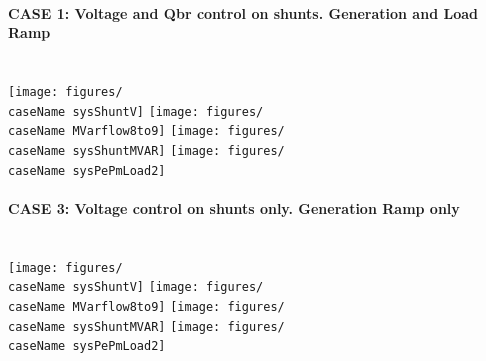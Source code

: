 \documentclass[12pt]{article}
\begin{document}
\pagebreak
\paragraph{CASE 1: Voltage and Qbr control on shunts. Generation and Load Ramp} \ \\
\renewcommand{\caseName}{sixMachineWindramp2}
\scrunch
\texttt{[image: figures/\\caseName sysShuntV]}
\scrunch
\texttt{[image: figures/\\caseName MVarflow8to9]}
\scrunch
\texttt{[image: figures/\\caseName sysShuntMVAR]}
\scrunch
\texttt{[image: figures/\\caseName sysPePmLoad2]}

\pagebreak
\paragraph{CASE 3: Voltage control on shunts only. Generation Ramp only} \ \\
\renewcommand{\caseName}{sixMachineWindramp3}
\scrunch
\texttt{[image: figures/\\caseName sysShuntV]}
\scrunch
\texttt{[image: figures/\\caseName MVarflow8to9]}
\scrunch
\texttt{[image: figures/\\caseName sysShuntMVAR]}
\scrunch
\texttt{[image: figures/\\caseName sysPePmLoad2]}
\end{document}
